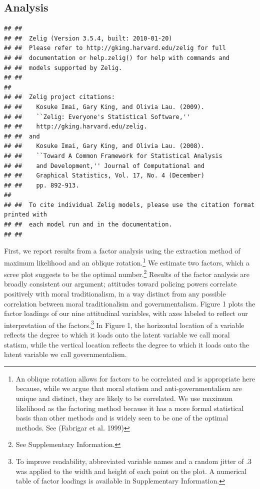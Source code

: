 \documentclass[12pt,]{article}
\let\rmarkdownfootnote\footnote%
\def\footnote{\protect\rmarkdownfootnote}
\begin{document}
\subsection{Analysis}\label{analysis}

\begin{verbatim}
## ## 
## ##  Zelig (Version 3.5.4, built: 2010-01-20)
## ##  Please refer to http://gking.harvard.edu/zelig for full
## ##  documentation or help.zelig() for help with commands and
## ##  models supported by Zelig.
## ##
## 
## ##  Zelig project citations:
## ##    Kosuke Imai, Gary King, and Olivia Lau. (2009).
## ##    ``Zelig: Everyone's Statistical Software,''
## ##    http://gking.harvard.edu/zelig.
## ##  and
## ##    Kosuke Imai, Gary King, and Olivia Lau. (2008).
## ##    ``Toward A Common Framework for Statistical Analysis
## ##    and Development,'' Journal of Computational and
## ##    Graphical Statistics, Vol. 17, No. 4 (December)
## ##    pp. 892-913. 
## 
## ##  To cite individual Zelig models, please use the citation format printed with
## ##  each model run and in the documentation.
## ##
\end{verbatim}

First, we report results from a factor analysis using the extraction
method of maximum likelihood and an oblique rotation.\footnote{An
  oblique rotation allows for factors to be correlated and is
  appropriate here because, while we argue that moral statism and
  anti-governmentalism are unique and distinct, they are likely to be
  correlated. We use maximum likelihood as the factoring method because
  it has a more formal statistical basis than other methods and is
  widely seen to be one of the optimal methods. See (Fabrigar et al.
  1999)} We estimate two factors, which a scree plot suggests to be the
optimal number.\footnote{See Supplementary Information.} Results of the
factor analysis are broadly consistent our argument; attitudes toward
policing powers correlate positively with moral traditionalism, in a way
distinct from any possible correlation between moral traditionalism and
governmentalism. Figure 1 plots the factor loadings of our nine
attitudinal variables, with axes labeled to reflect our interpretation
of the
factors.\footnote{To improve readability, abbreviated variable names and a random jitter of .3 was applied to the width and height of each point on the plot. A numerical table of factor loadings is available in Supplementary Information.}
In Figure 1, the horizontal location of a variable reflects the degree
to which it loads onto the latent variable we call moral statism, while
the vertical location reflects the degree to which it loads onto the
latent variable we call governmentalism.
\end{document}
